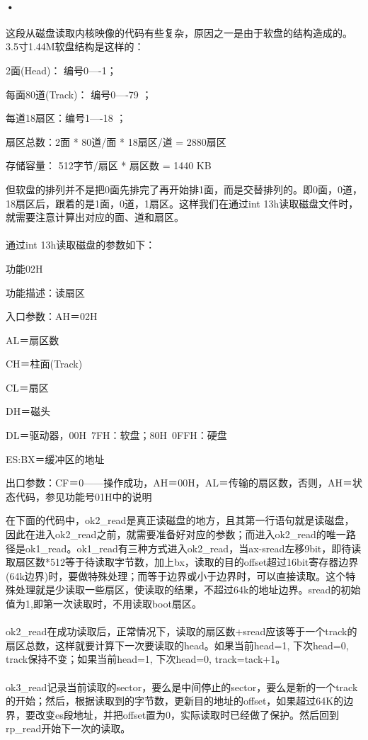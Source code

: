 \documentclass[12pt]{article}
\begin{document}
\paragraph{•}
这段从磁盘读取内核映像的代码有些复杂，原因之一是由于软盘的结构造成的。3.5寸1.44M软盘结构是这样的：
\begin{list}{•}{•}
\item 2面(Head)： 编号0----1； 
\item 每面80道(Track)： 编号0----79 ；
\item 每道18扇区：编号1----18 ；
\item 扇区总数：2面 * 80道/面 * 18扇区/道  =  2880扇区 
\item 存储容量： 512字节/扇区 * 扇区数 =  1440 KB
\end{list}
但软盘的排列并不是把0面先排完了再开始排1面，而是交替排列的。即0面，0道，18扇区后，跟着的是1面，0道，1扇区。这样我们在通过int 13h读取磁盘文件时，就需要注意计算出对应的面、道和扇区。\\\\
通过int 13h读取磁盘的参数如下：
\begin{list}{•}{•}
\item 功能02H  
\item 功能描述：读扇区 
\item 入口参数：AH＝02H 
\item AL＝扇区数 
\item CH＝柱面(Track) 
\item CL＝扇区 
\item DH＝磁头 
\item DL＝驱动器，00H~7FH：软盘；80H~0FFH：硬盘 
\item ES:BX＝缓冲区的地址 
\item 出口参数：CF＝0——操作成功，AH＝00H，AL＝传输的扇区数，否则，AH＝状态代码，参见功能号01H中的说明 
\end{list}
在下面的代码中，ok2\_read是真正读磁盘的地方，且其第一行语句就是读磁盘，因此在进入ok2\_read之前，就需要准备好对应的参数；而进入ok2\_read的唯一路径是ok1\_read。ok1\_read有三种方式进入ok2\_read，当ax-sread左移9bit，即待读取扇区数*512等于待读取字节数，加上bx，读取的目的offset超过16bit寄存器边界(64k边界)时，要做特殊处理；而等于边界或小于边界时，可以直接读取。这个特殊处理就是少读取一些扇区，使读取的结果，不超过64k的地址边界。sread的初始值为1,即第一次读取时，不用读取boot扇区。\\\\
ok2\_read在成功读取后，正常情况下，读取的扇区数+sread应该等于一个track的扇区总数，这样就要计算下一次要读取的head。如果当前head=1, 下次head=0, track保持不变；如果当前head=1, 下次head=0, track=tack+1。\\\\
ok3\_read记录当前读取的sector，要么是中间停止的sector，要么是新的一个track的开始；然后，根据读取到的字节数，更新目的地址的offset，如果超过64K的边界，要改变es段地址，并把offset置为0，实际读取时已经做了保护。然后回到rp\_read开始下一次的读取。
\end{document}
